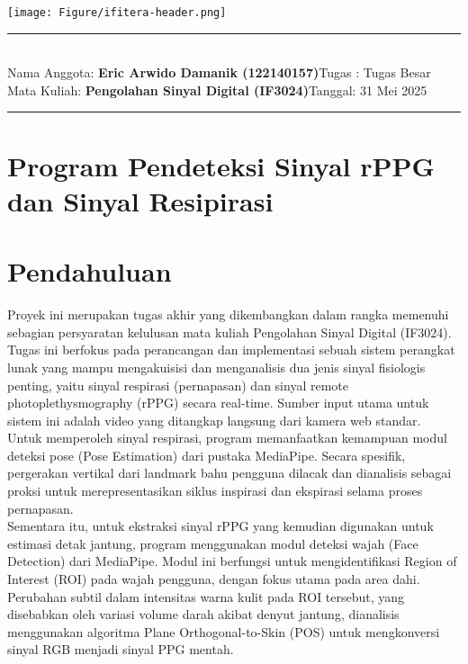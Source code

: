\documentclass[11pt,a4paper]{article}
\newcommand{\student}{\textbf{Eric Arwido Damanik (122140157)}}
\newcommand{\course}{\textbf{Pengolahan Sinyal Digital (IF3024)}}
\begin{document}
\thispagestyle{empty}
\begin{center}
	\texttt{[image: Figure/ifitera-header.png]}
	\vspace{0.1cm}
\end{center}
\noindent
\rule{17cm}{0.2cm}\\[0.3cm]
Nama Anggota: \student \hfill Tugas : Tugas Besar\\[0.1cm]
Mata Kuliah: \course \hfill Tanggal: 31 Mei 2025\\
\rule{17cm}{0.05cm}
\vspace{0.1cm}



\section*{Program Pendeteksi Sinyal rPPG dan Sinyal Resipirasi}
\section{Pendahuluan}
    Proyek ini merupakan tugas akhir yang dikembangkan dalam rangka memenuhi sebagian persyaratan kelulusan mata kuliah Pengolahan Sinyal Digital (IF3024). Tugas ini berfokus pada perancangan dan implementasi sebuah sistem perangkat lunak yang mampu mengakuisisi dan menganalisis dua jenis sinyal fisiologis penting, yaitu sinyal respirasi (pernapasan) dan sinyal remote photoplethysmography (rPPG) secara real-time. Sumber input utama untuk sistem ini adalah video yang ditangkap langsung dari kamera web standar.\\
    Untuk memperoleh sinyal respirasi, program memanfaatkan kemampuan modul deteksi pose (Pose Estimation) dari pustaka MediaPipe. Secara spesifik, pergerakan vertikal dari landmark bahu pengguna dilacak dan dianalisis sebagai proksi untuk merepresentasikan siklus inspirasi dan ekspirasi selama proses pernapasan.\\
    Sementara itu, untuk ekstraksi sinyal rPPG yang kemudian digunakan untuk estimasi detak jantung, program menggunakan modul deteksi wajah (Face Detection) dari MediaPipe. Modul ini berfungsi untuk mengidentifikasi Region of Interest (ROI) pada wajah pengguna, dengan fokus utama pada area dahi. Perubahan subtil dalam intensitas warna kulit pada ROI tersebut, yang disebabkan oleh variasi volume darah akibat denyut jantung, dianalisis menggunakan algoritma Plane Orthogonal-to-Skin (POS) untuk mengkonversi sinyal RGB menjadi sinyal PPG mentah.
\end{document}
